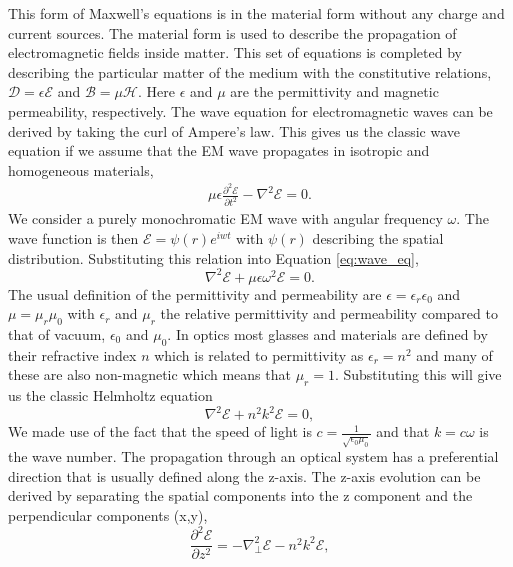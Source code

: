 \documentclass[letterpaper]{ar-1col}
\begin{document}
This form of Maxwell's equations is in the material form without any charge and current sources.
%
The material form is used to describe the propagation of electromagnetic fields inside matter.
%
This set of equations is completed by describing the particular matter of the medium with the constitutive relations, $\mathcal{D}=\epsilon \mathcal{E}$ and $\mathcal{B}=\mu \mathcal{H}$. 
%
Here $\epsilon$ and $\mu$ are the permittivity and magnetic permeability, respectively.
%
The wave equation for electromagnetic waves can be derived by taking the curl of Ampere's law.
%
This gives us the classic wave equation if we assume that the EM wave propagates in isotropic and homogeneous materials,
\begin{equation}
\label{eq:wave_eq}
\begin{aligned}
\mu \epsilon\frac{\partial^2 \mathcal{E}}{\partial t^2} - \nabla^2\mathcal{E} = 0 .
\end{aligned}
\end{equation}
We consider a purely monochromatic EM wave with angular frequency $\omega$.
%
The wave function is then $\mathcal{E}=\psi(r) e^{iwt}$ with $\psi(r)$ describing the spatial distribution.
%
Substituting this relation into Equation \ref{eq:wave_eq},
\begin{equation}
\nabla^2\mathcal{E} +\mu \epsilon \omega^2 \mathcal{E} = 0.
\end{equation}
The usual definition of the permittivity and permeability are $\epsilon=\epsilon_r \epsilon_0$ and $\mu=\mu_r \mu_0$ with $\epsilon_r$ and $\mu_r$ the relative permittivity and permeability compared to that of vacuum, $\epsilon_0$ and $\mu_0$.
%
In optics most glasses and materials are defined by their refractive index $n$ which is related to permittivity as $\epsilon_r = n^2$ and many of these are also non-magnetic which means that $\mu_r=1$.
%
Substituting this will give us the classic Helmholtz equation
\begin{equation}
\nabla^2\mathcal{E} + n^2k^2 \mathcal{E} = 0,
\end{equation}
We made use of the fact that the speed of light is $c = \frac{1}{\sqrt{\epsilon_0\mu_0}}$ and that $k = c\omega$ is the wave number.
%
The propagation through an optical system has a preferential direction that is usually defined along the z-axis.
%
The z-axis evolution can be derived by separating the spatial components into the z component and the perpendicular components (x,y),
\begin{equation}
\frac{\partial^2\mathcal{E}}{\partial z^2} = -\nabla_{\perp}^2\mathcal{E}-n^2k^2 \mathcal{E},
\end{equation}
\end{document}
